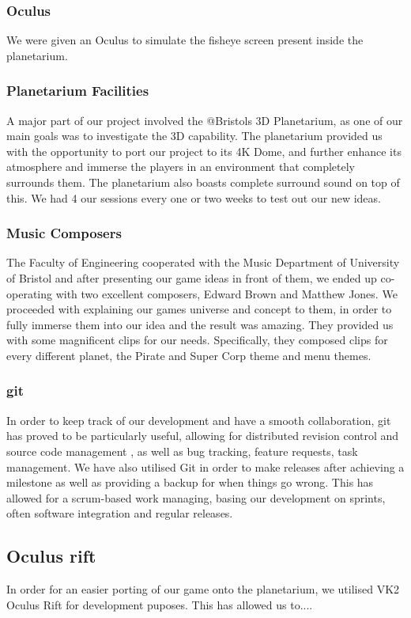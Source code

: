 \documentclass[11pt,a4paper]{article}
\begin{document}
\subsubsection{Oculus}

We were given an Oculus to simulate the fisheye screen present inside the planetarium. 

 \subsubsection{  Planetarium Facilities}
 A major part of our project involved the @Bristols 3D Planetarium, as one of our main goals was to investigate the 3D capability. The planetarium provided us with the opportunity to port our project to its 4K Dome, and further enhance its atmosphere and immerse the players in an environment that completely surrounds them. The planetarium also boasts complete surround sound on top of this. We had 4 our sessions every one or two weeks to test out our new ideas.

 \subsubsection{ Music Composers}
 The Faculty of Engineering cooperated with the Music Department of University of Bristol and after presenting our game ideas in front of them, we ended up co-operating with two excellent composers, Edward Brown and Matthew Jones. We proceeded with explaining our games universe and concept to them, in order to fully immerse them into our idea and the result was amazing. They provided us with some magnificent clips for our needs. Specifically, they composed clips for every different planet, the Pirate and Super Corp theme and  menu themes.


 \subsubsection{git}
 In order to keep track of our development and have a smooth collaboration, git has proved to be particularly useful, allowing for distributed revision control and source code management , as well as bug tracking, feature requests, task management. We have also utilised Git in order to make releases after achieving a milestone as well as providing a backup for when things go wrong. This has allowed for a scrum-based work managing, basing our development on sprints, often software integration and regular releases.


 \subsection{Oculus rift} 
 In order for an easier porting of our game onto the planetarium, we utilised VK2 Oculus Rift for development puposes. This has allowed us to....
\end{document}
